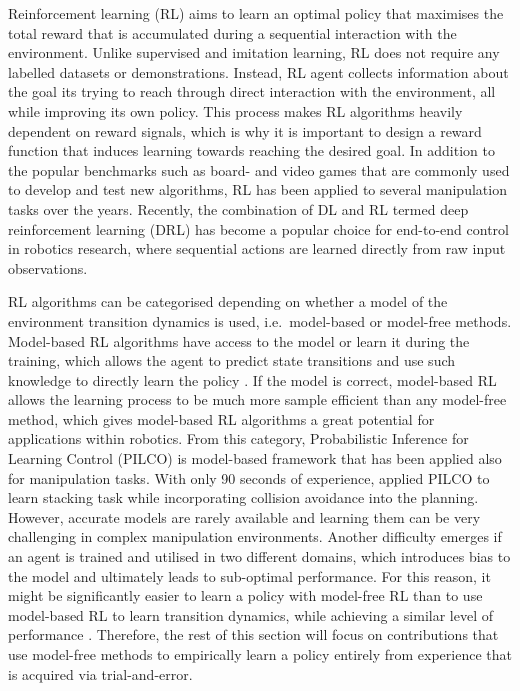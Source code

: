 Reinforcement learning (RL) \cite{sutton_reinforcement_2018} aims to learn an optimal policy that maximises the total reward that is accumulated during a sequential interaction with the environment. Unlike supervised and imitation learning, RL does not require any labelled datasets or demonstrations. Instead, RL agent collects information about the goal its trying to reach through direct interaction with the environment, all while improving its own policy. This process makes RL algorithms heavily dependent on reward signals, which is why it is important to design a reward function that induces learning towards reaching the desired goal. In addition to the popular benchmarks such as board- and video games that are commonly used to develop and test new algorithms, RL has been applied to several manipulation tasks over the years. Recently, the combination of DL and RL termed deep reinforcement learning (DRL) has become a popular choice for end-to-end control in robotics research, where sequential actions are learned directly from raw input observations.

RL algorithms can be categorised depending on whether a model of the environment transition dynamics is used, i.e.~model-based or model-free methods. Model-based RL algorithms have access to the model or learn it during the training, which allows the agent to predict state transitions and use such knowledge to directly learn the policy \cite{polydoros_survey_2017}. If the model is correct, model-based RL allows the learning process to be much more sample efficient than any model-free method, which gives model-based RL algorithms a great potential for applications within robotics. From this category, Probabilistic Inference for Learning Control (PILCO) \cite{deisenroth_pilco_2011} is model-based framework that has been applied also for manipulation tasks. With only 90 seconds of experience, \citet{durrant-whyte_learning_2012} applied PILCO to learn stacking task while incorporating collision avoidance into the planning. However, accurate models are rarely available and learning them can be very challenging in complex manipulation environments. Another difficulty emerges if an agent is trained and utilised in two different domains, which introduces bias to the model and ultimately leads to sub-optimal performance. For this reason, it might be significantly easier to learn a policy with model-free RL than to use model-based RL to learn transition dynamics, while achieving a similar level of performance \cite{kroemer_review_2021}. Therefore, the rest of this section will focus on contributions that use model-free methods to empirically learn a policy entirely from experience that is acquired via trial-and-error.

